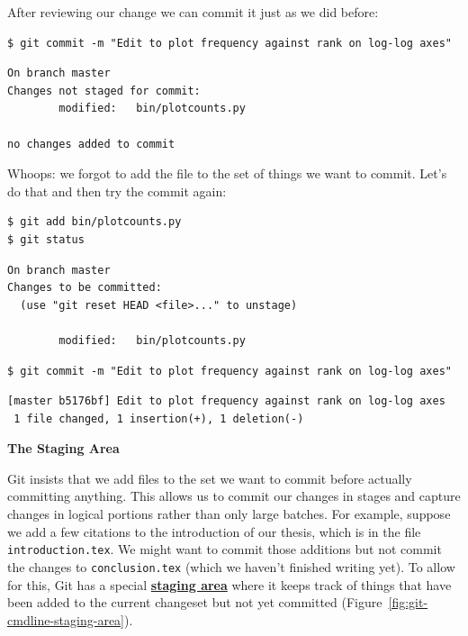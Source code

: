 \documentclass[
]{krantz}
\renewenvironment{quote}{\begin{VF}}{\end{VF}}
\newcommand{\gref}[2]{\hyperlink{#2}{\textbf{#1}}}
\begin{document}
After reviewing our change
we can commit it just as we did before:

\begin{verbatim}
$ git commit -m "Edit to plot frequency against rank on log-log axes"
\end{verbatim}

\begin{verbatim}
On branch master
Changes not staged for commit:
        modified:   bin/plotcounts.py

no changes added to commit
\end{verbatim}

Whoops:
we forgot to add the file to the set of things we want to commit.
Let's do that and then try the commit again:

\begin{verbatim}
$ git add bin/plotcounts.py
$ git status
\end{verbatim}

\begin{verbatim}
On branch master
Changes to be committed:
  (use "git reset HEAD <file>..." to unstage)

        modified:   bin/plotcounts.py
\end{verbatim}

\begin{verbatim}
$ git commit -m "Edit to plot frequency against rank on log-log axes"
\end{verbatim}

\begin{verbatim}
[master b5176bf] Edit to plot frequency against rank on log-log axes
 1 file changed, 1 insertion(+), 1 deletion(-)
\end{verbatim}

\begin{quote}
\textbf{The Staging Area}

Git insists that we add files to the set we want to commit before actually committing anything.
This allows us to commit our changes in stages and capture changes in logical portions
rather than only large batches.
For example,
suppose we add a few citations to the introduction of our thesis,
which is in the file \texttt{introduction.tex}.
We might want to commit those additions
but not commit the changes to \texttt{conclusion.tex} (which we haven't finished writing yet).
To allow for this,
Git has a special \gref{staging area}{git\_stage}
where it keeps track of things
that have been added to the current changeset but not yet committed
(Figure~\ref{fig:git-cmdline-staging-area}).
\end{quote}
\end{document}
